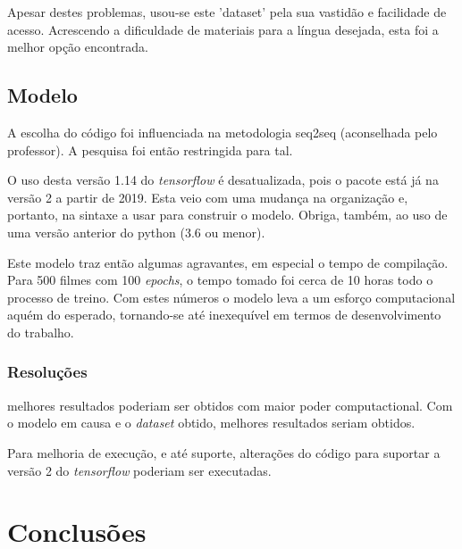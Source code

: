 \documentclass{article}
\begin{document}
Apesar destes problemas, usou-se este 'dataset' pela sua vastidão e facilidade de acesso. Acrescendo a dificuldade de materiais para a língua desejada, esta foi a melhor opção encontrada.

\subsection{Modelo}
A escolha do código foi influenciada na metodologia seq2seq (aconselhada pelo professor). A pesquisa foi então restringida para tal.

O uso desta versão 1.14 do \textit{tensorflow} é desatualizada, pois o pacote está já na versão 2 a partir de 2019. Esta veio com uma mudança na organização e, portanto, na sintaxe a usar para construir o modelo. Obriga, também, ao uso de uma versão anterior do python (3.6 ou menor). 

Este modelo traz então algumas agravantes, em especial o tempo de compilação. Para 500 filmes com 100 \textit{epochs}, o tempo tomado foi cerca de 10 horas todo o processo de treino. Com estes números o modelo leva a um esforço computacional aquém do esperado, tornando-se até inexequível em termos de desenvolvimento do trabalho.

\subsubsection{Resoluções}

melhores resultados poderiam ser obtidos com maior poder computactional. Com o modelo em causa e o \textit{dataset} obtido, melhores resultados seriam obtidos.

Para melhoria de execução, e até suporte, alterações do código para suportar a versão 2 do \textit{tensorflow} poderiam ser executadas.

\section{Conclusões}




\end{document}
